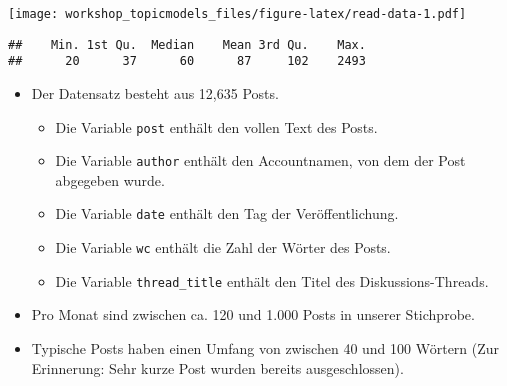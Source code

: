 \documentclass[
]{book}
\newenvironment{Shaded}{\begin{snugshade}}{\end{snugshade}}
\newcommand{\DataTypeTok}[1]{\textcolor[rgb]{0.13,0.29,0.53}{#1}}
\newcommand{\KeywordTok}[1]{\textcolor[rgb]{0.13,0.29,0.53}{\textbf{#1}}}
\newcommand{\NormalTok}[1]{#1}
\newcommand{\OperatorTok}[1]{\textcolor[rgb]{0.81,0.36,0.00}{\textbf{#1}}}
\newcommand{\StringTok}[1]{\textcolor[rgb]{0.31,0.60,0.02}{#1}}
\providecommand{\tightlist}{%
  \setlength{\itemsep}{0pt}\setlength{\parskip}{0pt}}
\begin{document}
\begin{Shaded}
\end{Shaded}

\texttt{[image: workshop\_topicmodels\_files/figure-latex/read-data-1.pdf]}

\begin{Shaded}
\end{Shaded}

\begin{verbatim}
##    Min. 1st Qu.  Median    Mean 3rd Qu.    Max. 
##      20      37      60      87     102    2493
\end{verbatim}

\begin{itemize}
\tightlist
\item
  Der Datensatz besteht aus 12,635 Posts.

  \begin{itemize}
  \tightlist
  \item
    Die Variable \texttt{post} enthält den vollen Text des Posts.
  \item
    Die Variable \texttt{author} enthält den Accountnamen, von dem der Post abgegeben wurde.
  \item
    Die Variable \texttt{date} enthält den Tag der Veröffentlichung.
  \item
    Die Variable \texttt{wc} enthält die Zahl der Wörter des Posts.
  \item
    Die Variable \texttt{thread\_title} enthält den Titel des Diskussions-Threads.
  \end{itemize}
\item
  Pro Monat sind zwischen ca. 120 und 1.000 Posts in unserer Stichprobe.
\item
  Typische Posts haben einen Umfang von zwischen 40 und 100 Wörtern (Zur Erinnerung: Sehr kurze Post wurden bereits ausgeschlossen).
\end{itemize}

  
\end{document}
